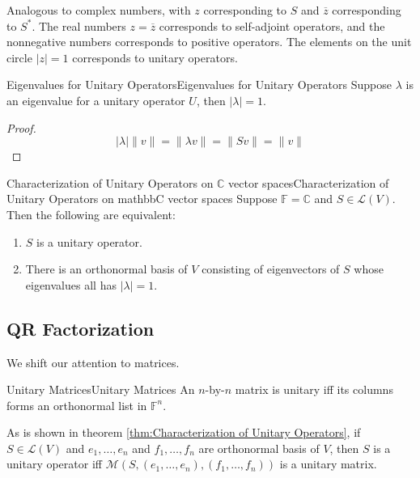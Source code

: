 \documentclass[../main.tex]{subfiles}
\begin{document}
\begin{remark}
Analogous to complex numbers, with $z$ corresponding to $S$ and $\overline{z}$ corresponding to $S^*$. The real numbers $z=\overline{z}$ corresponds to self-adjoint operators, and the nonnegative numbers corresponds to positive operators. The elements on the unit circle $\left|z\right|=1$ corresponds to unitary operators.
\end{remark}

\begin{theorem}{Eigenvalues for Unitary Operators}{Eigenvalues for Unitary Operators}
Suppose $\lambda$ is an eigenvalue for a unitary operator $U$, then $\left|\lambda\right|=1$.
\end{theorem}
\begin{proof}
\begin{equation*}
\left|\lambda\right|\|v\| = \|\lambda v\| = \|Sv\| = \|v\|
\end{equation*}
\end{proof}

\begin{theorem}{Characterization of Unitary Operators on $\mathbb{C}$ vector spaces}{Characterization of Unitary Operators on mathbbC vector spaces}
Suppose $\mathbb{F}=\mathbb{C}$ and $S\in \mathscr{L}(V)$. Then the following are equivalent:
\begin{enumerate}
	\item $S$ is a unitary operator.
	\item There is an orthonormal basis of $V$ consisting of eigenvectors of $S$ whose eigenvalues all has $\left|\lambda\right|=1$.
\end{enumerate}
\end{theorem}


\subsection{QR Factorization}
We shift our attention to matrices.

\begin{definition}{Unitary Matrices}{Unitary Matrices}
An $n$-by-$n$ matrix is unitary iff its columns forms an orthonormal list in $\mathbb{F}^n$.
\end{definition}

\begin{remark}
	As is shown in theorem \ref{thm:Characterization of Unitary Operators}, if $S\in \mathscr{L}(V)$ and $e_1, \ldots ,e_n$ and $f_1, \ldots ,f_n$ are orthonormal basis of $V$, then $S$ is a unitary operator iff $\mathscr{M}(S,(e_1, \ldots ,e_n),(f_1, \ldots ,f_n))$ is a unitary matrix. 
\end{remark}
\end{document}
